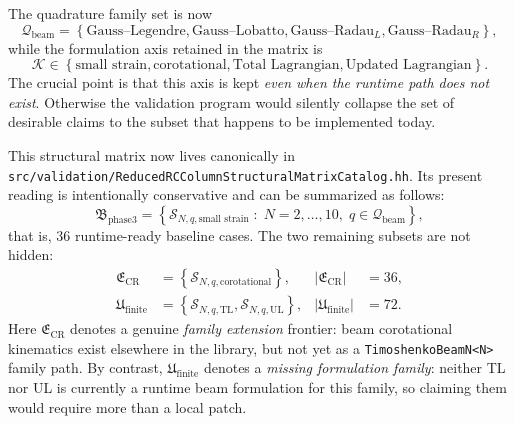 The quadrature family set is now
\begin{equation}
  \mathcal{Q}_{\text{beam}}
  =
  \left\{
    \text{Gauss--Legendre},
    \text{Gauss--Lobatto},
    \text{Gauss--Radau}_{L},
    \text{Gauss--Radau}_{R}
  \right\},
\end{equation}
while the formulation axis retained in the matrix is
\begin{equation}
  \mathcal{K}
  \in
  \left\{
    \text{small strain},
    \text{corotational},
    \text{Total Lagrangian},
    \text{Updated Lagrangian}
  \right\}.
\end{equation}
The crucial point is that this axis is kept \emph{even when the runtime path
does not exist}.  Otherwise the validation program would silently collapse the
set of desirable claims to the subset that happens to be implemented today.

This structural matrix now lives canonically in
\texttt{src/validation/ReducedRCColumnStructuralMatrixCatalog.hh}.  Its present
reading is intentionally conservative and can be summarized as follows:
\begin{equation}
  \mathfrak{B}_{\text{phase3}}
  =
  \left\{
    \mathcal{S}_{N,q,\text{small strain}}
    \;:\;
    N=2,\dots,10,\;
    q \in \mathcal{Q}_{\text{beam}}
  \right\},
\end{equation}
that is, \(36\) runtime-ready baseline cases.
The two remaining subsets are not hidden:
\begin{align}
  \mathfrak{E}_{\text{CR}}
  &=
  \left\{
    \mathcal{S}_{N,q,\text{corotational}}
  \right\},
  &
  |\mathfrak{E}_{\text{CR}}| &= 36,
  \\
  \mathfrak{U}_{\text{finite}}
  &=
  \left\{
    \mathcal{S}_{N,q,\text{TL}},
    \mathcal{S}_{N,q,\text{UL}}
  \right\},
  &
  |\mathfrak{U}_{\text{finite}}| &= 72.
\end{align}
Here \(\mathfrak{E}_{\text{CR}}\) denotes a genuine \emph{family extension}
frontier: beam corotational kinematics exist elsewhere in the library, but not
yet as a \texttt{TimoshenkoBeamN<N>} family path.  By contrast,
\(\mathfrak{U}_{\text{finite}}\) denotes a \emph{missing formulation family}:
neither TL nor UL is currently a runtime beam formulation for this family, so
claiming them would require more than a local patch.

